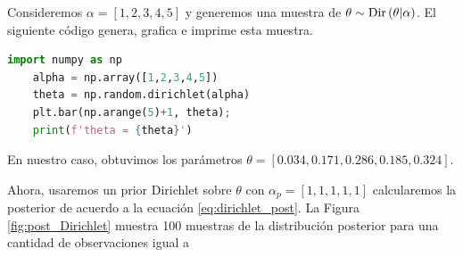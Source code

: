 \begin{example}
	Consideremos $\alpha = [1,2,3,4,5]$ y generemos una muestra de $\theta\sim\text{Dir}\left(\theta|\alpha\right)$. El siguiente código genera, grafica e imprime esta muestra. 
	\begin{lstlisting}[language=Python]
	import numpy as np
	alpha = np.array([1,2,3,4,5]) 
	theta = np.random.dirichlet(alpha)
	plt.bar(np.arange(5)+1, theta);
	print(f'theta = {theta}')
\end{lstlisting}
En nuestro caso, obtuvimos los parámetros $ \theta = [0.034, 0.171, 0.286, 0.185, 0.324]$.

 Ahora, usaremos un prior Dirichlet sobre $\theta$ con $\alpha_p = [1,1,1,1,1]$ calcularemos la posterior de acuerdo a la ecuación \ref{eq:dirichlet_post}. La Figura \ref{fig:post_Dirichlet} muestra 100 muestras de la distribución posterior para una cantidad de observaciones igual a 







\end{example}
